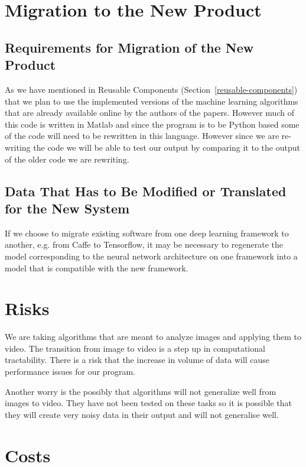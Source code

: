 \documentclass{scrreprt}
\begin{document}
\section{Migration to the New Product}

\subsection{Requirements for Migration of the New Product}

{As we have mentioned in Reusable Components
(Section~\ref{reusable-components}) that we plan to use the implemented
versions of the machine learning algorithms that are already available online
by the authors of the papers. However much of this code is written in Matlab
and since the program is to be Python based some of the code will need to be
rewritten in this language. However since we are re-writing the code we will be
able to test our output by comparing it to the output of the older code we are
rewriting.}

\subsection{Data That Has to Be Modified or Translated for the New
            System}

If we choose to migrate existing software from one deep learning framework to
another, e.g. from Caffe to Tensorflow, it may be necessary to regenerate the
model corresponding to the neural network architecture on one framework into a
model that is compatible with the new framework.

\section{Risks}

{We are taking algorithms that are meant to analyze images and applying
them to video. The transition from image to video is a step up in
computational tractability. There is a risk that the increase in volume
of data will cause performance issues for our program.}

{Another worry is the possibly that algorithms will not generalize well
from images to video. They have not been tested on these tasks so it is
possible that they will create very noisy data in their output and will
not generalise well.}

\section{Costs}
\end{document}
